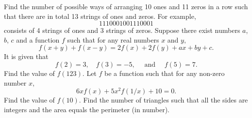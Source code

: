 \begin{enumerate}
    \begin{center}
    \end{center}
    \hyperrefitem[Q::2023-S-1-22] Find the number of possible ways of arranging 10 ones and 11 zeros in a row such that there are in total 13 strings of ones and zeros. For example, \[1110001001110001\] consists of 4 strings of ones and 3 strings of zeros.
    \hyperrefitem[Q::2023-S-1-23] Suppose there exist numbers $a$, $b$, $c$ and a function $f$ such that for any real numbers $x$ and $y$, \[f(x + y) + f(x - y) = 2f(x) + 2f(y) + ax + by + c.\] It is given that \[f(2) = 3, \quad f(3) = -5, \quad \text{ and } \quad f(5) = 7.\] Find the value of $f(123)$.
    \hyperrefitem[Q::2023-S-1-24] Let $f$ be a function such that for any non-zero number $x$, \[6xf(x) + 5x^2 f(1/x) + 10 = 0.\] Find the value of $f(10)$.
    \hyperrefitem[Q::2023-S-1-25] Find the number of triangles such that all the sides are integers and the area equals the perimeter (in number).
\end{enumerate}